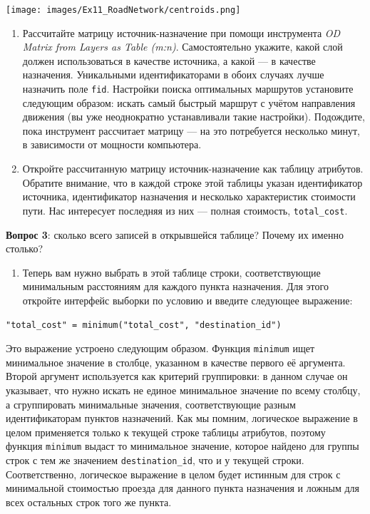 \documentclass[
  12pt,
]{book}
\providecommand{\tightlist}{%
  \setlength{\itemsep}{0pt}\setlength{\parskip}{0pt}}
\begin{document}
\texttt{[image: images/Ex11\_RoadNetwork/centroids.png]}

\begin{enumerate}
\def\labelenumi{\arabic{enumi}.}
\setcounter{enumi}{2}
\item
  Рассчитайте матрицу источник-назначение при помощи инструмента \emph{OD Matrix from Layers as Table (m:n)}. Самостоятельно укажите, какой слой должен использоваться в качестве источника, а какой --- в качестве назначения. Уникальными идентификаторами в обоих случаях лучше назначить поле \texttt{fid}. Настройки поиска оптимальных маршрутов установите следующим образом: искать самый быстрый маршрут с учётом направления движения (вы уже неоднократно устанавливали такие настройки). Подождите, пока инструмент рассчитает матрицу --- на это потребуется несколько минут, в зависимости от мощности компьютера.
\item
  Откройте рассчитанную матрицу источник-назначение как таблицу атрибутов. Обратите внимание, что в каждой строке этой таблицы указан идентификатор источника, идентификатор назначения и несколько характеристик стоимости пути. Нас интересует последняя из них --- полная стоимость, \texttt{total\_cost}.
\end{enumerate}

\textbf{Вопрос 3}: сколько всего записей в открывшейся таблице? Почему их именно столько?

\begin{enumerate}
\def\labelenumi{\arabic{enumi}.}
\setcounter{enumi}{4}
\tightlist
\item
  Теперь вам нужно выбрать в этой таблице строки, соответствующие минимальным расстояниям для каждого пункта назначения. Для этого откройте интерфейс выборки по условию и введите следующее выражение:
\end{enumerate}

\texttt{"total\_cost"\ =\ minimum("total\_cost",\ "destination\_id")}

Это выражение устроено следующим образом. Функция \texttt{minimum} ищет минимальное значение в столбце, указанном в качестве первого её аргумента. Второй аргумент используется как критерий группировки: в данном случае он указывает, что нужно искать не единое минимальное значение по всему столбцу, а сгруппировать минимальные значения, соответствующие разным идентификаторам пунктов назначений. Как мы помним, логическое выражение в целом применяется только к текущей строке таблицы атрибутов, поэтому функция \texttt{minimum} выдаст то минимальное значение, которое найдено для группы строк с тем же значением \texttt{destination\_id}, что и у текущей строки. Соответственно, логическое выражение в целом будет истинным для строк с минимальной стоимостью проезда для данного пункта назначения и ложным для всех остальных строк того же пункта.
\end{document}
